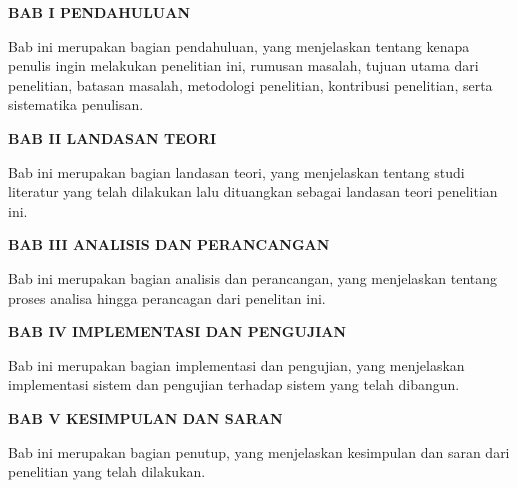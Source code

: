 \noindent 
\textbf{BAB I \hspace{1cm} PENDAHULUAN}
\begin{addmargin}[2.35cm]{0em}
Bab ini merupakan bagian pendahuluan, yang menjelaskan tentang kenapa penulis ingin melakukan penelitian ini, rumusan masalah, tujuan utama dari penelitian, batasan masalah, metodologi penelitian, kontribusi penelitian, serta sistematika penulisan.
\end{addmargin}

\noindent 
\textbf{BAB II \hspace{1cm} LANDASAN TEORI}
\begin{addmargin}[2.35cm]{0em}
Bab ini merupakan bagian landasan teori, yang menjelaskan tentang studi literatur yang telah dilakukan lalu dituangkan sebagai landasan teori penelitian ini.
\end{addmargin}

\noindent 
\textbf{BAB III \hspace{1cm} ANALISIS DAN PERANCANGAN}
\begin{addmargin}[2.35cm]{0em}
Bab ini merupakan bagian analisis dan perancangan, yang menjelaskan tentang proses analisa hingga perancagan dari penelitan ini.
\end{addmargin}

\noindent 
\textbf{BAB IV \hspace{1cm} IMPLEMENTASI DAN PENGUJIAN}
\begin{addmargin}[2.35cm]{0em}
Bab ini merupakan bagian implementasi dan pengujian, yang menjelaskan implementasi sistem dan pengujian terhadap sistem yang telah dibangun.
\end{addmargin}

\noindent 
\textbf{BAB V \hspace{1cm}  KESIMPULAN DAN SARAN}
\begin{addmargin}[2.35cm]{0em}
Bab ini merupakan bagian penutup, yang menjelaskan kesimpulan dan saran dari penelitian yang telah dilakukan.
\end{addmargin}

\newpage